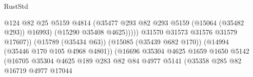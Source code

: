 \begin{lexlean}{RustStd}
\begin{coremodule}
                                                            @124
                                                            @82
                                                            @25
                                                            @5159
                                                            @4814
                                                            (@35477
                                                              @293
                                                              @82
                                                              @293
                                                              @5159
                                                              (@15064 (@35482 @293))
                                                              @16993)
                                                            (@15290 @35408 @4625)))))
                                                    @31570
                                                    @31573
                                                    @31576
                                                    @31579
                                                    @17607))
                                                (@15789 (@35434 @63))
                                                (@15085 (@35439 @682 @170))
                                                (@14994 (@35446 @170 @105 @4968 @4801))
                                                (@16696
                                                  @35304
                                                  @4625
                                                  @1659
                                                  @1650
                                                  @5142
                                                  (@16705
                                                    @35304
                                                    @4625
                                                    @189
                                                    @283
                                                    @82
                                                    @84
                                                    @4977
                                                    @5141
                                                    (@35358
                                                      @285
                                                      @82
                                                      @16719
                                                      @4977
                                                      @17044

\end{coremodule}
\end{lexlean}

